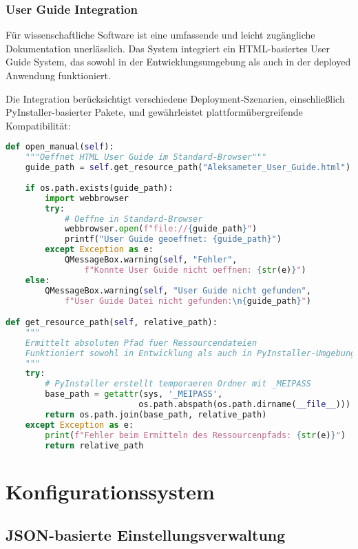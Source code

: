 \subsubsection{User Guide Integration}

Für wissenschaftliche Software ist eine umfassende und leicht zugängliche Dokumentation unerlässlich. Das System integriert ein HTML-basiertes User Guide System, das sowohl in der Entwicklungsumgebung als auch in der deployed Anwendung funktioniert.

Die Integration berücksichtigt verschiedene Deployment-Szenarien, einschließlich PyInstaller-basierter Pakete, und gewährleistet plattformübergreifende Kompatibilität:

\begin{lstlisting}[language=Python, caption=User Guide System Implementation]
def open_manual(self):
    """Oeffnet HTML User Guide im Standard-Browser"""
    guide_path = self.get_resource_path("Aleksameter_User_Guide.html")
    
    if os.path.exists(guide_path):
        import webbrowser
        try:
            # Oeffne in Standard-Browser
            webbrowser.open(f"file://{guide_path}")
            printf("User Guide geoeffnet: {guide_path}")
        except Exception as e:
            QMessageBox.warning(self, "Fehler", 
                f"Konnte User Guide nicht oeffnen: {str(e)}")
    else:
        QMessageBox.warning(self, "User Guide nicht gefunden", 
            f"User Guide Datei nicht gefunden:\n{guide_path}")

def get_resource_path(self, relative_path):
    """
    Ermittelt absoluten Pfad fuer Ressourcendateien
    Funktioniert sowohl in Entwicklung als auch in PyInstaller-Umgebung
    """
    try:
        # PyInstaller erstellt temporaeren Ordner mit _MEIPASS
        base_path = getattr(sys, '_MEIPASS', 
                           os.path.abspath(os.path.dirname(__file__)))
        return os.path.join(base_path, relative_path)
    except Exception as e:
        print(f"Fehler beim Ermitteln des Ressourcenpfads: {str(e)}")
        return relative_path
\end{lstlisting}

\section{Konfigurationssystem}

\subsection{JSON-basierte Einstellungsverwaltung}

